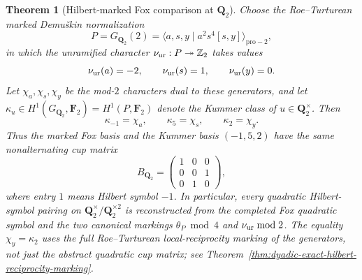 \documentclass[11pt]{article}
\newtheorem{theorem}{Theorem}[section]
\theoremstyle{definition}
\begin{document}
\begin{theorem}[Hilbert-marked Fox comparison at $\mathbf Q_2$]
\label{thm:dyadic-fox-hilbert-marked}
Choose the Roe--Turturean marked Demu\v{s}kin normalization
\cite{RoeTurtureanGQ2}
\[
P=G_{\mathbf Q_2}(2)
 =\langle a,s,y\mid a^2s^4[s,y]\rangle_{\mathrm{pro}-2},
\]
in which the unramified character
$\nu_{\rm ur}:P\twoheadrightarrow\mathbb Z_2$
takes values
\begin{equation}\label{eq:q2-unramified-marking}
 \nu_{\rm ur}(a)=-2,\qquad
 \nu_{\rm ur}(s)=1,\qquad
 \nu_{\rm ur}(y)=0.
\end{equation}
Let $\chi_a,\chi_s,\chi_y$ be the mod-$2$ characters
dual to these generators, and let
$\kappa_u\in H^1(G_{\mathbf Q_2},\mathbf F_2)
=H^1(P,\mathbf F_2)$ denote the Kummer class
of $u\in\mathbf Q_2^\times$.
Then
\begin{equation}\label{eq:q2-kummer-fox-markings}
 \boxed{\quad
 \kappa_{-1}=\chi_a,\qquad
 \kappa_{5}=\chi_s,\qquad
 \kappa_2=\chi_y.
 \quad}
\end{equation}
Thus the marked Fox basis and the Kummer basis
$(-1,5,2)$ have the \emph{same} nonalternating cup matrix
\begin{equation}\label{eq:q2-hilbert-fox-matrix}
 B_{\mathbf Q_2}=
 \begin{pmatrix}
 1&0&0\\
 0&0&1\\
 0&1&0
 \end{pmatrix},
\end{equation}
where entry $1$ means Hilbert symbol $-1$.
In particular, every quadratic Hilbert-symbol pairing on
$\mathbf Q_2^\times/\mathbf Q_2^{\times2}$ is reconstructed
from the completed Fox quadratic symbol and the two canonical
markings $\theta_P\bmod4$ and $\nu_{\rm ur}\bmod2$.
The equality $\chi_y=\kappa_2$ uses the \emph{full} Roe--Turturean
local-reciprocity marking of the generators, not just the
abstract quadratic cup matrix; see
Theorem~\ref{thm:dyadic-exact-hilbert-reciprocity-marking}.
\end{theorem}
\end{document}
